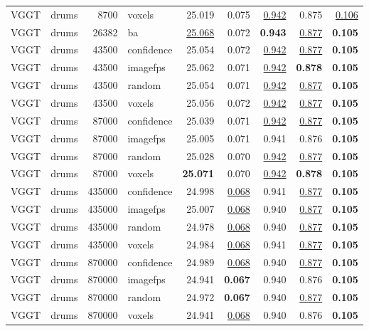 \begin{table}[H]
\begin{tabular}{llrlrrrrr}
VGGT & drums & 8700 & voxels & 25.019 & 0.075 & \underline{0.942} & 0.875 & \underline{0.106} \\
VGGT & drums & 26382 & ba & \underline{25.068} & 0.072 & \textbf{0.943} & \underline{0.877} & \textbf{0.105} \\
VGGT & drums & 43500 & confidence & 25.054 & 0.072 & \underline{0.942} & \underline{0.877} & \textbf{0.105} \\
VGGT & drums & 43500 & imagefps & 25.062 & 0.071 & \underline{0.942} & \textbf{0.878} & \textbf{0.105} \\
VGGT & drums & 43500 & random & 25.054 & 0.071 & \underline{0.942} & \underline{0.877} & \textbf{0.105} \\
VGGT & drums & 43500 & voxels & 25.056 & 0.072 & \underline{0.942} & \underline{0.877} & \textbf{0.105} \\
VGGT & drums & 87000 & confidence & 25.039 & 0.071 & \underline{0.942} & \underline{0.877} & \textbf{0.105} \\
VGGT & drums & 87000 & imagefps & 25.005 & 0.071 & 0.941 & 0.876 & \textbf{0.105} \\
VGGT & drums & 87000 & random & 25.028 & 0.070 & \underline{0.942} & \underline{0.877} & \textbf{0.105} \\
VGGT & drums & 87000 & voxels & \textbf{25.071} & 0.070 & \underline{0.942} & \textbf{0.878} & \textbf{0.105} \\
VGGT & drums & 435000 & confidence & 24.998 & \underline{0.068} & 0.941 & \underline{0.877} & \textbf{0.105} \\
VGGT & drums & 435000 & imagefps & 25.007 & \underline{0.068} & 0.940 & \underline{0.877} & \textbf{0.105} \\
VGGT & drums & 435000 & random & 24.978 & \underline{0.068} & 0.940 & \underline{0.877} & \textbf{0.105} \\
VGGT & drums & 435000 & voxels & 24.984 & \underline{0.068} & 0.941 & \underline{0.877} & \textbf{0.105} \\
VGGT & drums & 870000 & confidence & 24.989 & \underline{0.068} & 0.940 & \underline{0.877} & \textbf{0.105} \\
VGGT & drums & 870000 & imagefps & 24.941 & \textbf{0.067} & 0.940 & 0.876 & \textbf{0.105} \\
VGGT & drums & 870000 & random & 24.972 & \textbf{0.067} & 0.940 & \underline{0.877} & \textbf{0.105} \\
VGGT & drums & 870000 & voxels & 24.941 & \underline{0.068} & 0.940 & 0.876 & \textbf{0.105} \\
\bottomrule
\end{tabular}
\end{table}